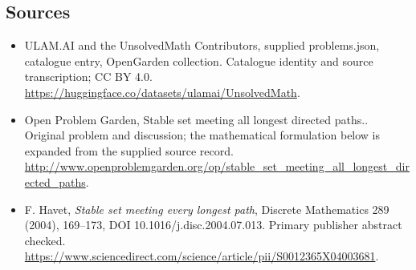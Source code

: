 \documentclass[11pt,a4paper]{article}
\begin{document}
\subsection{Sources}
\begin{itemize}
\item[S1] ULAM.AI and the UnsolvedMath Contributors, supplied problems.json, catalogue entry, OpenGarden collection. Catalogue identity and source transcription; CC BY 4.0.
\url{https://huggingface.co/datasets/ulamai/UnsolvedMath}.
\item[S2] Open Problem Garden, Stable set meeting all longest directed paths.. Original problem and discussion; the mathematical formulation below is expanded from the supplied source record.
\url{http://www.openproblemgarden.org/op/stable_set_meeting_all_longest_directed_paths}.
\item[R1] F. Havet, \emph{Stable set meeting every longest path}, Discrete Mathematics 289 (2004), 169--173, DOI 10.1016/j.disc.2004.07.013. Primary publisher abstract checked.
\url{https://www.sciencedirect.com/science/article/pii/S0012365X04003681}.
\end{itemize}
\end{document}
